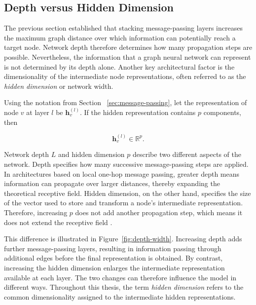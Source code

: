 \documentclass[english]{lni}
\begin{document}

\subsection{Depth versus Hidden Dimension}
\label{sec:depth-width}

The previous section established that stacking message-passing layers increases the maximum graph distance over which information can potentially reach a target node. Network depth therefore determines how many propagation steps are possible. Nevertheless, the information that a graph neural network can represent is not determined by its depth alone. Another key architectural factor is the dimensionality of the intermediate node representations, often referred to as the \emph{hidden dimension} or network width.

Using the notation from Section ~\ref{sec:message-passing}, let the representation of node $v$ at layer $l$ be $\mathbf{h}_v^{(l)}$. If the hidden representation contains $p$ components, then

\[
    \mathbf{h}_v^{(l)} \in \mathbb{R}^{p}.
\]

Network depth $L$ and hidden dimension $p$ describe two different aspects of the network. Depth specifies how many successive message-passing steps are applied. In architectures based on local one-hop message passing, greater depth means information can propagate over larger distances, thereby expanding the theoretical receptive field. Hidden dimension, on the other hand, specifies the size of the vector used to store and transform a node’s intermediate representation. Therefore, increasing $p$ does not add another propagation step, which means it does not extend the receptive field \cite{loukas2020depthwidth}.

This difference is illustrated in Figure~\ref{fig:depth-width}. Increasing depth adds further message-passing layers, resulting in information passing through additional edges before the final representation is obtained. By contrast, increasing the hidden dimension enlarges the intermediate representation available at each layer. The two changes can therefore influence the model in different ways. Throughout this thesis, the term \emph{hidden dimension} refers to the common dimensionality assigned to the intermediate hidden representations.
\end{document}
